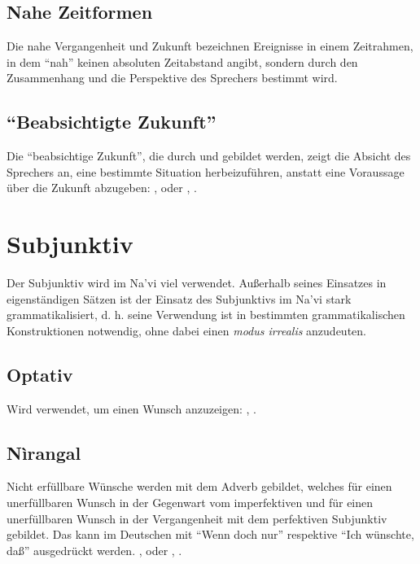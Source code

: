 \subsection{Nahe Zeitformen} Die nahe Vergangenheit und Zukunft bezeichnen Ereignisse in
einem Zeitrahmen, in dem "`nah"' keinen absoluten Zeitabstand angibt, sondern durch den
Zusammenhang und die Perspektive des Sprechers bestimmt wird.

\subsection{"`Beabsichtigte Zukunft"'} Die "`beabsichtige Zukunft"', die durch 
und  gebildet werden, zeigt die Absicht des Sprechers an, eine bestimmte
Situation herbeizuf\"uhren, anstatt eine Voraussage \"uber die Zukunft abzugeben:
,  oder , .
\label{syn:verb:intenfut}

\section{Subjunktiv}
\noindent Der Subjunktiv wird im Na’vi viel verwendet. Au\ss{}erhalb seines Einsatzes in
eigenst\"andigen S\"atzen ist der Einsatz des Subjunktivs im Na’vi stark grammatikalisiert,
d. h. seine Verwendung ist in bestimmten grammatikalischen Konstruktionen notwendig, ohne
dabei einen \textit{modus irrealis} anzudeuten.

\subsection{Optativ} Wird verwendet, um einen Wunsch anzuzeigen: , .

\subsection{N\`irangal} Nicht erf\"ullbare W\"unsche werden mit dem Adverb 
gebildet, welches f\"ur einen unerf\"ullbaren Wunsch in der Gegenwart vom imperfektiven
und f\"ur einen unerf\"ullbaren Wunsch in der Vergangenheit mit dem perfektiven Subjunktiv
gebildet. Das kann im Deutschen mit "`Wenn doch nur"' respektive "`Ich w\"unschte, da\ss{}"'
ausgedr\"uckt werden.
,  oder , .

